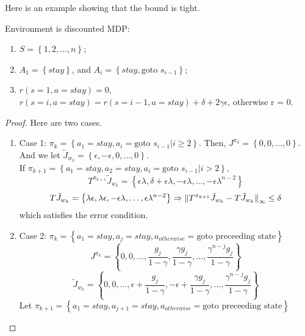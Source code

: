 Here is an example showing that the bound is tight.

\begin{example}
    Environment is discounted MDP:\\
    \begin{enumerate}
        \item $ S = \left\{ 1, 2, \ldots, n \right\} $;
        \item $ A_1 = \left\{ stay \right\}$, and $ A_i = \left\{ stay, \text{goto } s_{i-1} \right\} $;
        \item $ r(s = 1, a = stay) = 0 $, $ r(s = i, a = stay) = r(s = i-1, a = stay) + \delta + 2\gamma \epsilon $, otherwise r = 0.
    \end{enumerate}
    \begin{proof}
        Here are two cases.
        \begin{enumerate}
            \item Case 1: $ \pi_k = \left\{ a_1 = stay, a_i = \text{goto }s_{i-1} | i \ge 2 \right\} $. Then, $ J^{\pi_k} = \left\{ 0, 0, \ldots, 0 \right\} $. And we let $ \tilde J_{w_k} = \left\{ \epsilon, -\epsilon, 0, \ldots, 0 \right\} $.\\
                If $ \pi_{k+1} = \left\{ a_1 = stay, a_2 = stay, a_i = \text{goto }s_{i-1} | i > 2 \right\} $,
                \[
                    T^{\pi_{k+1}}\tilde J_{w_k} = \left\{ \epsilon\lambda, \delta + \epsilon\lambda, -\epsilon\lambda, \ldots, -\epsilon\lambda^{n-2} \right\}
                \]
                \[
                    T \tilde J_{w_k} = \left\{ \lambda\epsilon, \lambda\epsilon, -\epsilon\lambda, \ldots, \epsilon\lambda^{n-2} \right\} \Rightarrow {\Arrowvert T^{\pi_{k+1}}\tilde J_{w_k} - T\tilde J_{w_k} \Arrowvert}_\infty \le \delta
                \]
                which satisfies the error condition.
            \item Case 2: $ \pi_{k} = \left\{ a_1 = stay, a_j = stay, a_{otherwise} = \text{goto preceeding state} \right\} $
                \[
                    J^{\pi_k} = \left\{ 0, 0,\ldots, \frac{g_j}{1 - \gamma}, \frac{\gamma g_j}{1 - \gamma}, \ldots, \frac{\gamma^{n-j}g_j}{1 - \gamma} \right\}
                \]
                \[
                    \tilde J_{w_k} = \left\{ 0, 0,\ldots, \epsilon + \frac{g_j}{1 - \gamma}, -\epsilon + \frac{\gamma g_j}{1 - \gamma}, \ldots, \frac{\gamma^{n-j}g_j}{1 - \gamma} \right\}
                \]
                Let $ \pi_{k+1} = \left\{ a_1 = stay, a_{j+1} = stay, a_{otherwise} = \text{goto preceeding state} \right\} $
                \[
\]
\end{enumerate}
\end{proof}
\end{example}
